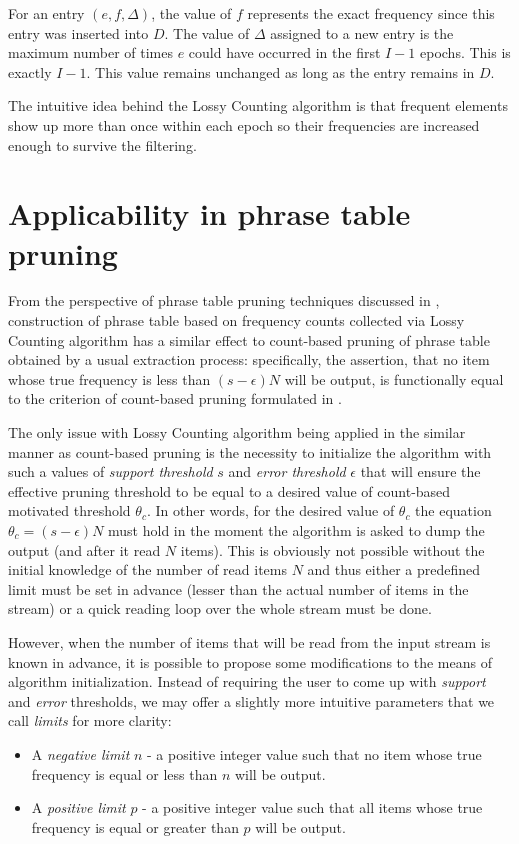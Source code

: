 For an entry $(e, f, \Delta)$, the value of $f$ represents the exact frequency
since this entry was inserted into $D$.
The value of $\Delta$ assigned to a new entry is the maximum number of times
$e$ could have occurred in the first $I-1$ epochs. This is exactly $I-1$.
This value remains unchanged as long as the entry remains in $D$.

The intuitive idea behind the Lossy Counting algorithm is that frequent elements
show up more than once within each epoch so their frequencies are increased enough
to survive the filtering.

\section{Applicability in phrase table pruning}
\label{sec:lossy-counting-applicability}

From the perspective of phrase table pruning techniques discussed in
, construction of phrase table based on frequency counts
collected via Lossy Counting algorithm has a similar effect to count-based pruning of
phrase table obtained by a usual extraction process:
specifically, the assertion, that no item whose true frequency is less than
$(s - \epsilon)N$ will be output, is functionally equal to the criterion of
count-based pruning formulated in .

The only issue with Lossy Counting algorithm being applied in the similar manner as
count-based pruning is the necessity to initialize the algorithm with such a values of
\emph{support threshold} $s$ and \emph{error threshold} $\epsilon$ that will ensure
the effective pruning threshold to be equal to a desired value of count-based
motivated threshold $\theta_{c}$.
In other words, for the desired value of $\theta_{c}$ the equation $\theta_{c} = (s - \epsilon)N$
must hold in the moment the algorithm is asked to dump the output (and after it read $N$ items).
This is obviously not possible without the initial knowledge of the number of read
items $N$ and thus either a predefined limit must be set in advance (lesser than
the actual number of items in the stream) or a quick reading loop over the whole stream
must be done.

However, when the number of items that will be read from the input stream is known
in advance, it is possible to propose some modifications to the means of algorithm
initialization.
Instead of requiring the user to come up with \emph{support} and \emph{error} thresholds,
we may offer a slightly more intuitive parameters that we call \emph{limits} for more clarity:
\begin{itemize}
  \item A \emph{negative limit} $n$ - a positive integer value such that no item
    whose true frequency is equal or less than $n$ will be output.
  \item A \emph{positive limit} $p$ - a positive integer value such that all items
    whose true frequency is equal or greater than $p$ will be output.
\end{itemize}

